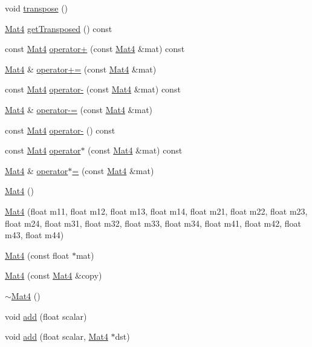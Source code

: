 \begin{DoxyCompactItemize}
\item 
void \hyperlink{classMat4_af8b85ea76f3b7225ee33878029b1d18e}{transpose} ()
\item 
\hyperlink{classMat4}{Mat4} \hyperlink{classMat4_a483b4b6142791d63aad164d917bfcdb8}{get\+Transposed} () const
\item 
const \hyperlink{classMat4}{Mat4} \hyperlink{classMat4_a090a17553d3708ee4a6e686c7b861e86}{operator+} (const \hyperlink{classMat4}{Mat4} \&mat) const
\item 
\hyperlink{classMat4}{Mat4} \& \hyperlink{classMat4_a1f15bf1f4ff4c4084019732127259df8}{operator+=} (const \hyperlink{classMat4}{Mat4} \&mat)
\item 
const \hyperlink{classMat4}{Mat4} \hyperlink{classMat4_ae56d2c741f3bafc30024da58083bb8f4}{operator-\/} (const \hyperlink{classMat4}{Mat4} \&mat) const
\item 
\hyperlink{classMat4}{Mat4} \& \hyperlink{classMat4_ae6b419586fa52b27404626c38d78dbdb}{operator-\/=} (const \hyperlink{classMat4}{Mat4} \&mat)
\item 
const \hyperlink{classMat4}{Mat4} \hyperlink{classMat4_a23ddc905ed3d3400c62cb6f60f8577e2}{operator-\/} () const
\item 
const \hyperlink{classMat4}{Mat4} \hyperlink{classMat4_adfc2da7f18cf258791b388bf3333d7ef}{operator$\ast$} (const \hyperlink{classMat4}{Mat4} \&mat) const
\item 
\hyperlink{classMat4}{Mat4} \& \hyperlink{classMat4_aff7f316cabd6773d02b1704fe1b629b2}{operator$\ast$=} (const \hyperlink{classMat4}{Mat4} \&mat)
\item 
\hyperlink{classMat4_a53cb3c6c2a0b594345f0107b6c1fcc37}{Mat4} ()
\item 
\hyperlink{classMat4_a9ff0ba7e863527c97206e38a12b9738c}{Mat4} (float m11, float m12, float m13, float m14, float m21, float m22, float m23, float m24, float m31, float m32, float m33, float m34, float m41, float m42, float m43, float m44)
\item 
\hyperlink{classMat4_ae32b0c3f7fc370336cedb7bbee98a32a}{Mat4} (const float $\ast$mat)
\item 
\hyperlink{classMat4_a67ddcbb4713bb335042aef3b14324456}{Mat4} (const \hyperlink{classMat4}{Mat4} \&copy)
\item 
\hyperlink{classMat4_a72fac55214c733b56248d2b321aaf69b}{$\sim$\+Mat4} ()
\item 
void \hyperlink{classMat4_aa33c5fad52aba88880b36d95c6ae85ae}{add} (float scalar)
\item 
void \hyperlink{classMat4_a686767982006e42351c87a027af12c17}{add} (float scalar, \hyperlink{classMat4}{Mat4} $\ast$dst)

\end{DoxyCompactItemize}

